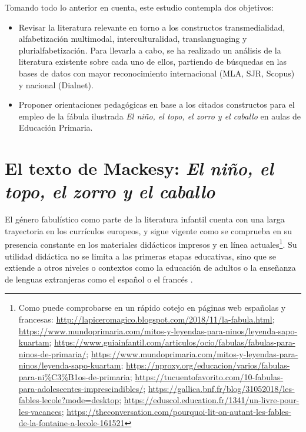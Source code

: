 \documentclass[spanish]{textolivre}
\begin{document}
Tomando todo lo anterior en cuenta, este estudio contempla dos objetivos:

\begin{itemize}
    \item Revisar la literatura relevante en torno a los constructos transmedialidad, alfabetización multimodal, interculturalidad, translanguaging y plurialfabetización. Para llevarla a cabo, se ha realizado un análisis de la literatura existente sobre cada uno de ellos, partiendo de búsquedas en las bases de datos con mayor reconocimiento internacional (MLA, SJR, Scopus) y nacional (Dialnet).
    \item Proponer orientaciones pedagógicas en base a los citados constructos para el empleo de la fábula ilustrada \textit{El niño, el topo, el zorro y el caballo} en aulas de Educación Primaria.
\end{itemize}
      

\section{El texto de Mackesy: \textit{El niño, el topo, el zorro y el caballo}}\label{sec-conduta}
El género fabulístico como parte de la literatura infantil cuenta con una larga trayectoria en los currículos europeos, y sigue vigente como se comprueba en su presencia constante en los materiales didácticos impresos y en línea actuales\footnote{Como puede comprobarse en un rápido cotejo en páginas web españolas y francesas: \url{http://lapiceromagico.blogspot.com/2018/11/la-fabula.html}; \url{https://www.mundoprimaria.com/mitos-y-leyendas-para-ninos/leyenda-sapo-kuartam}; \url{https://www.guiainfantil.com/articulos/ocio/fabulas/fabulas-para-ninos-de-primaria/}; \url{https://www.mundoprimaria.com/mitos-y-leyendas-para-ninos/leyenda-sapo-kuartam}; \url{https://nproxy.org/educacion/varios/fabulas-para-ni\%C3\%B1os-de-primaria}; \url{https://tucuentofavorito.com/10-fabulas-para-adolescentes-imprescindibles/}; \url{https://gallica.bnf.fr/blog/31052018/les-fables-lecole?mode=desktop}; \url{https://eduscol.education.fr/1341/un-livre-pour-les-vacances}; \url{https://theconversation.com/pourquoi-lit-on-autant-les-fables-de-la-fontaine-a-lecole-161521}}. Su utilidad didáctica no se limita a las primeras etapas educativas, sino que se extiende a otros niveles o contextos como la educación de adultos \cite{dido_fabula_2008} o la enseñanza de lenguas extranjeras como el español \cite{prinz_cuentos_2021} o el francés \cite{badenas_roig_cuento_2015}.
\end{document}
